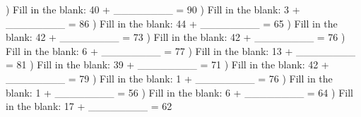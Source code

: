 \documentclass{article}%
\begin{document}
\newline%
\newline%
) Fill in the blank: 40 + \_\_\_\_\_\_\_\_ = 90%
\newline%
\newline%
) Fill in the blank: 3 + \_\_\_\_\_\_\_\_ = 86%
\newline%
\newline%
) Fill in the blank: 44 + \_\_\_\_\_\_\_\_ = 65%
\newline%
\newline%
) Fill in the blank: 42 + \_\_\_\_\_\_\_\_ = 73%
\newline%
\newline%
) Fill in the blank: 42 + \_\_\_\_\_\_\_\_ = 76%
\newline%
\newline%
) Fill in the blank: 6 + \_\_\_\_\_\_\_\_ = 77%
\newline%
\newline%
) Fill in the blank: 13 + \_\_\_\_\_\_\_\_ = 81%
\newline%
\newline%
) Fill in the blank: 39 + \_\_\_\_\_\_\_\_ = 71%
\newline%
\newline%
) Fill in the blank: 42 + \_\_\_\_\_\_\_\_ = 79%
\newline%
\newline%
) Fill in the blank: 1 + \_\_\_\_\_\_\_\_ = 76%
\newline%
\newline%
) Fill in the blank: 1 + \_\_\_\_\_\_\_\_ = 56%
\newline%
\newline%
) Fill in the blank: 6 + \_\_\_\_\_\_\_\_ = 64%
\newline%
\newline%
) Fill in the blank: 17 + \_\_\_\_\_\_\_\_ = 62%
\end{document}
